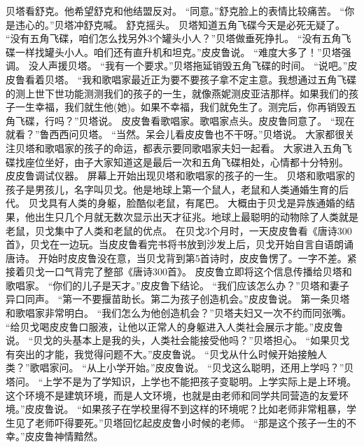 \documentclass[a4paper,12pt,UTF8,twoside]{ctexbook}
\begin{document}
        贝塔看舒克。他希望舒克和他结盟反对。  
        “同意。”舒克脸上的表情比较痛苦。  
        “你是违心的。”贝塔冲舒克喊。        
        舒克摇头。  
        贝塔知道五角飞碟今天是必死无疑了。  
        “没有五角飞碟，咱们怎么找另外3个罐头小人？”贝塔做垂死挣扎。  
        “没有五角飞碟一样找罐头小人。咱们还有直升机和坦克。”皮皮鲁说。  
        “难度大多了！”贝塔强调。  
        没人声援贝塔。  
        “我有一个要求。”贝塔拖延销毁五角飞碟的时间。  
        “说吧。”皮皮鲁看着贝塔。  
        “我和歌唱家最近正为要不要孩子拿不定主意。我想通过五角飞碟的测上世下世功能测测我们的孩子的一生，就像燕妮测皮亚洁那样。如果我们的孩子一生幸福，我们就生他(她)。如果不幸福，我们就免生了。测完后，你再销毁五角飞碟，行吗？”贝塔说。  
        皮皮鲁看歌唱家。歌唱家点头。皮皮鲁同意了。  
        “现在就看？”鲁西西问贝塔。  
        “当然。呆会儿看皮皮鲁也不干呀。”贝塔说。  
        大家都很关注贝塔和歌唱家的孩子的命运，都表示要同歌唱家夫妇一起看。  
        大家进入五角飞碟找座位坐好，由子大家知道这是最后一次和五角飞碟相处，心情都十分特别。        
        皮皮鲁调试仪器。  
        屏幕上开始出现贝塔和歌唱家的孩子的一生。  
        贝塔和歌唱家的孩子是男孩儿，名字叫贝戈。他是地球上第一个鼠人，老鼠和人类通婚生育的后代。  
        贝戈具有人类的身躯，脸酷似老鼠，有尾巴。  
        大概由于贝戈是异族通婚的结果，他出生只几个月就无数次显示出天才征兆。地球上最聪明的动物除了人类就是老鼠，贝戈集中了人类和老鼠的优点。  
        在贝戈3个月时，一天皮皮鲁看《唐诗300首》，贝戈在一边玩。当皮皮鲁看完书将书放到沙发上后，贝戈开始自言自语朗诵唐诗。  
        开始时皮皮鲁没在意，当贝戈背到第5首诗时，皮皮鲁愣了。一字不差。紧接着贝戈一口气背完了整部《唐诗300首》。  
        皮皮鲁立即将这个信息传播给贝塔和歌唱家。  
        “你们的儿子是天才。”皮皮鲁下结论。  
        “我们应该怎么办？”贝塔和妻子异口同声。  
        “第一不要揠苗助长。第二为孩子创造机会。”皮皮鲁说。  
        第一条贝塔和歌唱家非常明白。  
        “我们怎么为他创造机会？”贝塔夫妇又一次不约而同张嘴。  
        “给贝戈喝皮皮鲁口服液，让他以正常人的身躯进入人类社会展示才能。”皮皮鲁说。  
        “贝戈的头基本上是我的头，人类社会能接受他吗？”贝塔担心。  
        “如果贝戈有突出的才能，我觉得问题不大。”皮皮鲁说。  
        “贝戈从什么时候开始接触人类？”歌唱家问。  
        “从上小学开始。”皮皮鲁说。  
        “贝戈这么聪明，还用上学吗？”贝塔问。  
        “上学不是为了学知识，上学也不能把孩子变聪明。上学实际上是上环境。这个环境不是建筑环境，而是人文环境，也就是由老师和同学共同营造的友爱环境。”皮皮鲁说。  
        “如果孩子在学校里得不到这样的环境呢？比如老师非常粗暴，学生见了老师吓得要死。”贝塔回忆起皮皮鲁小时候的老师。  
        “那是这个孩子一生的不幸。”皮皮鲁神情黯然。  
\end{document}
